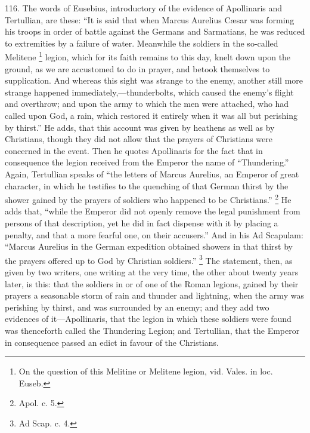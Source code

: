 116.
The words of Eusebius, introductory of the evidence of Apollinaris and
Tertullian, are these: ``It is said that when Marcus Aurelius Cæsar
was forming his troops in order of battle against the Germans and
Sarmatians, he was reduced to extremities by a failure of water.
Meanwhile the soldiers in the so-called Melitene \footnote{On the question of this Melitine or Melitene legion, vid. Vales. in
loc. Euseb.} legion, which for its faith remains to this day, knelt down
upon the ground, as we are accustomed to do in prayer, and betook
themselves to supplication. And whereas this sight was strange to the
enemy, another still more strange happened
immediately,—thunderbolts, which caused the enemy's flight and
overthrow; and upon the army to which the men were attached, who had
called upon God, a rain, which restored it entirely when it was all
but perishing by thirst.'' He adds, that this account was given by
heathens as well as by Christians, though they did not allow that the
prayers of Christians were concerned in the event. Then he quotes
Apollinaris for the fact that in consequence the legion received from
the Emperor the name of ``Thundering.'' Again, Tertullian speaks of ``the
letters of Marcus Aurelius, an Emperor of great character, in which he
testifies to the quenching of that German thirst by the shower gained
by the prayers of soldiers who happened to be Christians.'' \footnote{Apol. c. 5.} He adds that, ``while the Emperor did not openly remove the
legal punishment from persons of that description, yet he did in fact
dispense with it by placing a penalty, and that a more fearful one, on
their accusers.'' And in his Ad Scapulam: ``Marcus Aurelius in the
German expedition obtained showers in that thirst by the prayers
offered up to God by Christian soldiers.'' \footnote{Ad Scap. c. 4.} The statement, then, as given by two writers, one writing at
the very time, the other about twenty years later, is this: that the
soldiers in or of one of the Roman legions, gained by their prayers a
seasonable storm of rain and thunder and lightning, when the army was
perishing by thirst, and was surrounded by an enemy; and they add two
evidences of it—Apollinaris, that the legion in which these soldiers
were found was thenceforth called the Thundering Legion; and
Tertullian, that the Emperor in consequence passed an edict in favour
of the Christians.

